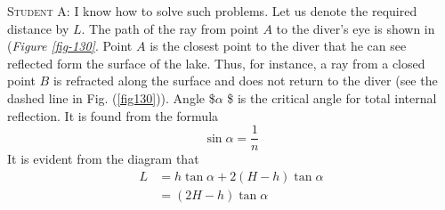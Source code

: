 \documentclass[a4paper,sfsidenotes]{tufte-book}
\begin{document}
\textsc{Student A:} I know how to solve such problems. Let us denote the required distance by $L$. The path of the ray from point $A$ to the diver's eye is shown in (\emph{Figure \ref{fig-130}}. Point $A$ is the closest point to the diver that he can see reflected form the surface of the lake. Thus, for instance, a ray from a closed point $B$ is refracted along the surface and does not return to the diver (see the dashed line in Fig. (\ref{fig130})). Angle \$$\alpha$ \$ is the critical angle for total internal reflection. It is found from the formula 
\begin{equation}%
\sin \alpha = \frac{1}{n} 
\label{eq-193}
\end{equation}
 It is evident from the diagram that 
 \begin{align*}
L & = h \tan \alpha + 2 (H - h) \tan \alpha \\
& = (2H -h) \tan \alpha
 \end{align*}
 
\end{document}
